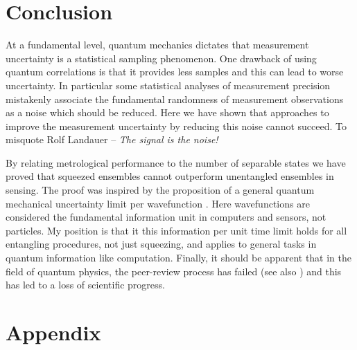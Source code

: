 \documentclass[reqno]{amsart}
\begin{document}

\section*{Conclusion}
At a fundamental level, quantum mechanics dictates that measurement uncertainty is a statistical sampling phenomenon. One drawback of using quantum correlations is that it provides less samples and this can lead to worse uncertainty. In particular some statistical analyses of measurement precision mistakenly associate the fundamental randomness of measurement observations as a noise which should be reduced. Here we have shown that approaches to improve the measurement uncertainty by reducing this noise cannot succeed. To misquote Rolf Landauer -- \textit{The signal is the noise!}

By relating metrological performance to the number of separable states we have proved that squeezed ensembles cannot outperform unentangled ensembles in sensing. The proof was inspired by the proposition of a general quantum mechanical uncertainty limit per wavefunction \cite{McGuinness2021a}. Here wavefunctions are considered the fundamental information unit in computers and sensors, not particles. My position is that it this information per unit time limit holds for all entangling procedures, not just squeezing, and applies to general tasks in quantum information like computation. Finally, it should be apparent that in the field of quantum physics, the peer-review process has failed (see also \cite{McGuinness2022, McGuinness2023, McGuinness2023a}) and this has led to a loss of scientific progress.


%

\newpage

\section*{Appendix}
\end{document}
